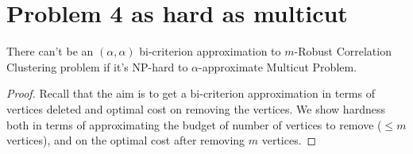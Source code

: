 


\section{Problem 4 as hard as multicut}

\begin{theorem}
There can't be an $(\alpha, \alpha)$ bi-criterion approximation to $m$-Robust Correlation Clustering problem if it's NP-hard to $\alpha$-approximate Multicut Problem.
\end{theorem}
\begin{proof}
Recall that the aim is to get a bi-criterion approximation in terms of vertices deleted and optimal cost on removing the vertices. We show hardness both in terms of approximating the budget of number of vertices to remove ($\le m$ vertices), and on the optimal cost after removing $m$ vertices.
\end{proof}

